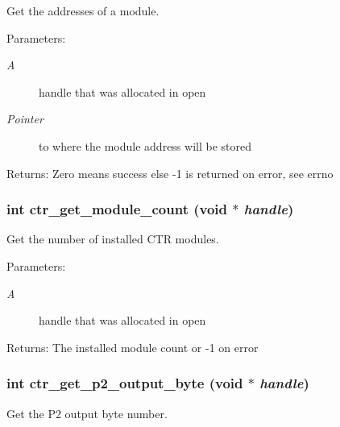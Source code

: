 Get the addresses of a module. 

\begin{Desc}
\item[Parameters:]
\begin{description}
\item[{\em A}]handle that was allocated in open \item[{\em Pointer}]to where the module address will be stored \end{description}
\end{Desc}
\begin{Desc}
\item[Returns:]Zero means success else -1 is returned on error, see errno \end{Desc}
\subsubsection{\setlength{\rightskip}{0pt plus 5cm}int ctr\_\-get\_\-module\_\-count (void $\ast$ {\em handle})}\label{libctr_8doxygen_d9dffdbd573bcf32445f2925f73ca7a0}


Get the number of installed CTR modules. 

\begin{Desc}
\item[Parameters:]
\begin{description}
\item[{\em A}]handle that was allocated in open \end{description}
\end{Desc}
\begin{Desc}
\item[Returns:]The installed module count or -1 on error \end{Desc}
\subsubsection{\setlength{\rightskip}{0pt plus 5cm}int ctr\_\-get\_\-p2\_\-output\_\-byte (void $\ast$ {\em handle})}\label{libctr_8doxygen_e1a6170e3efe17795221bc749b6605f6}


Get the P2 output byte number. 


